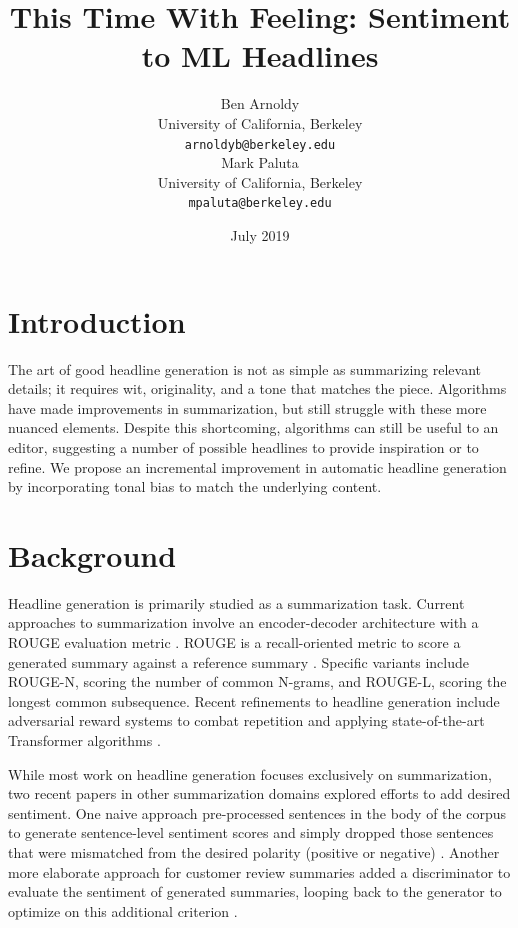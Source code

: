\documentclass[11pt]{article}
\title{This Time With Feeling: Sentiment to ML Headlines}
\author{Ben Arnoldy \\
  University of California, Berkeley \\
  {\tt arnoldyb@berkeley.edu} \\\And
  Mark Paluta \\
  University of California, Berkeley \\
  {\tt mpaluta@berkeley.edu} \\}
\date{July 2019}
\begin{document}
\maketitle

\begin{abstract}
    
\end{abstract}

\section{Introduction}
The art of good headline generation is not as simple as summarizing relevant details; it requires wit, originality, and a tone that matches the piece. Algorithms have made improvements in summarization, but still struggle with these more nuanced elements. Despite this shortcoming, algorithms can still be useful to an editor, suggesting a number of possible headlines to provide inspiration or to refine. We propose an incremental improvement in automatic headline generation by incorporating tonal bias to match the underlying content.

\section{Background}
Headline generation is primarily studied as a summarization task. Current approaches to summarization involve an encoder-decoder architecture \citep{rush2015neural} with a ROUGE evaluation metric \cite{Ayana2017}. ROUGE is a recall-oriented metric to score a generated summary against a reference summary \cite{lin-2004-rouge}. Specific variants include ROUGE-N, scoring the number of common N-grams, and ROUGE-L, scoring the longest common subsequence. Recent refinements to headline generation include adversarial reward systems to combat repetition \cite{DBLP:journals/corr/abs-1902-07110} and applying state-of-the-art Transformer algorithms \cite{DBLP:journals/corr/abs-1901-07786}.

While most work on headline generation focuses exclusively on summarization, two recent papers in other summarization domains explored efforts to add desired sentiment. One naive approach pre-processed sentences in the body of the corpus to generate sentence-level sentiment scores and simply dropped those sentences that were mismatched from the desired polarity (positive or negative) \cite{DBLP:journals/corr/abs-1802-09426}. Another more elaborate approach for customer review summaries added a discriminator to evaluate the sentiment of generated summaries, looping back to the generator to optimize on this additional criterion \cite{DBLP:journals/corr/HuYLSX17}. 
\end{document}
